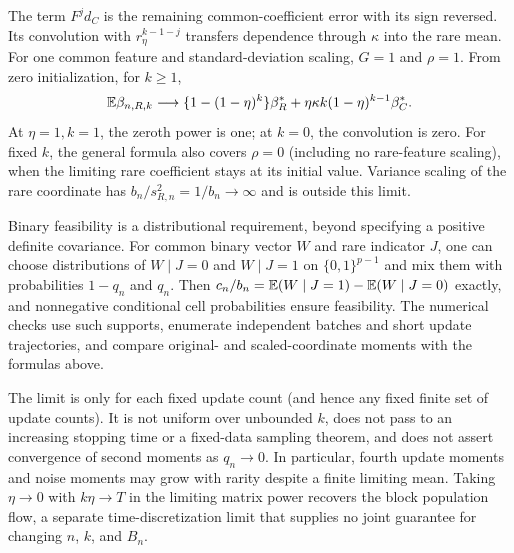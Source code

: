 The term $F^jd_C$ is the remaining common-coefficient error with its sign
reversed. Its convolution with $r_\eta^{k-1-j}$ transfers dependence through
$\kappa$ into the rare mean. For one common feature and standard-deviation
scaling, $G = 1$ and $\rho = 1$. From zero initialization, for $k \ge 1$,
\[
 \mathbb{E}\beta_{n,R,k} \longrightarrow \{1 - (1 - \eta)^k\}\beta_R^*
                                 + \eta\kappa k(1 - \eta)^{k-1}\beta_C^*.
\]
At $\eta = 1,k = 1$, the zeroth power is one; at $k = 0$, the convolution is
zero. For fixed $k$, the general formula also covers $\rho = 0$ (including no
rare-feature scaling), when the limiting rare coefficient stays at its initial
value. Variance scaling of the rare coordinate has
$b_n/s_{R,n}^2 = 1/b_n \to \infty$ and is outside this limit.

Binary feasibility is a distributional requirement, beyond specifying a positive
definite covariance. For common binary vector $W$ and rare indicator $J$, one
can choose distributions of $W \mid J = 0$ and $W \mid J = 1$ on $\{0,1\}^{p-1}$
and mix them with probabilities $1 - q_n$ and $q_n$. Then
$c_n/b_n = \mathbb{E}(W \mid J = 1) - \mathbb{E}(W \mid J = 0)$ exactly, and nonnegative
conditional cell probabilities ensure feasibility. The numerical checks use such
supports, enumerate independent batches and short update trajectories, and
compare original- and scaled-coordinate moments with the formulas above.

The limit is only for each fixed update count (and hence any fixed finite set of
update counts). It is not uniform over unbounded $k$, does not pass to an
increasing stopping time or a fixed-data sampling theorem, and does not assert
convergence of second moments as $q_n \to 0$. In particular, fourth update
moments and noise moments may grow with rarity despite a finite limiting mean.
Taking $\eta \to 0$ with $k\eta \to T$ in the limiting matrix power recovers the
block population flow, a separate time-discretization limit that supplies no
joint guarantee for changing $n$, $k$, and $B_n$.
